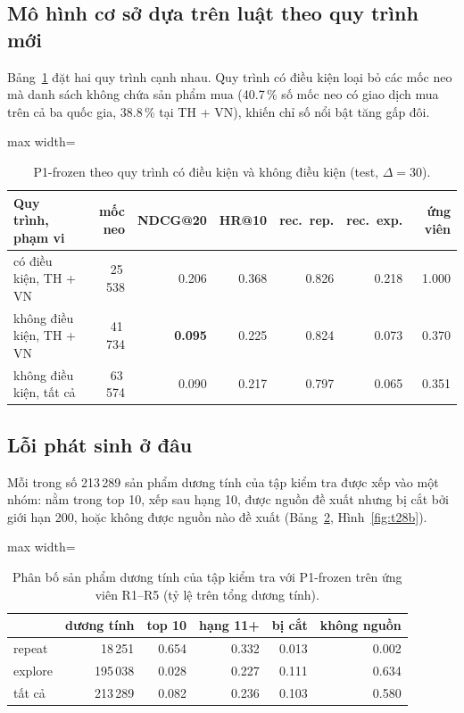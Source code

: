 \documentclass[jtehm]{ieeeaccess}
\newcommand{\nNoPosShare}{40.7}      %
\begin{document}
\subsection{Mô hình cơ sở dựa trên luật theo quy trình mới}
Bảng~\ref{tab:t28} đặt hai quy trình cạnh nhau. Quy trình có điều kiện loại bỏ các mốc neo mà danh sách không chứa sản phẩm mua (\nNoPosShare{}\,\% số mốc neo có giao dịch mua trên cả ba quốc gia, 38.8\,\% tại TH + VN), khiến chỉ số nổi bật tăng gấp đôi.

\begin{table}[t]
\caption{P1-frozen theo quy trình có điều kiện và không điều kiện (test, $\Delta = 30$).}
\label{tab:t28}
\setlength{\tabcolsep}{3pt}
\centering
\begin{adjustbox}{max width=\columnwidth}
\begin{tabular}{lrrrrrr}
\toprule
Quy trình, phạm vi & mốc neo & NDCG@20 & HR@10 & rec.\ rep. & rec.\ exp. & ứng viên \\
\midrule
có điều kiện, TH + VN   & 25\,538 & 0.206 & 0.368 & 0.826 & 0.218 & 1.000 \\
không điều kiện, TH + VN & 41\,734 & \textbf{0.095} & 0.225 & 0.824 & 0.073 & 0.370 \\
không điều kiện, tất cả     & 63\,574 & 0.090 & 0.217 & 0.797 & 0.065 & 0.351 \\
\bottomrule
\end{tabular}
\end{adjustbox}
\end{table}

\subsection{Lỗi phát sinh ở đâu}
Mỗi trong số 213\,289 sản phẩm dương tính của tập kiểm tra được xếp vào một nhóm: nằm trong top 10, xếp sau hạng 10, được nguồn đề xuất nhưng bị cắt bởi giới hạn 200, hoặc không được nguồn nào đề xuất (Bảng~\ref{tab:t28b}, Hình~\ref{fig:t28b}).

\begin{table}[t]
\caption{Phân bố sản phẩm dương tính của tập kiểm tra với P1-frozen trên ứng viên R1--R5 (tỷ lệ trên tổng dương tính).}
\label{tab:t28b}
\setlength{\tabcolsep}{4pt}
\centering
\begin{adjustbox}{max width=\columnwidth}
\begin{tabular}{lrrrrr}
\toprule
 & dương tính & top 10 & hạng 11+ & bị cắt & không nguồn \\
\midrule
repeat  & 18\,251  & 0.654 & 0.332 & 0.013 & 0.002 \\
explore & 195\,038 & 0.028 & 0.227 & 0.111 & 0.634 \\
tất cả  & 213\,289 & 0.082 & 0.236 & 0.103 & 0.580 \\
\bottomrule
\end{tabular}
\end{adjustbox}
\end{table}
\end{document}
